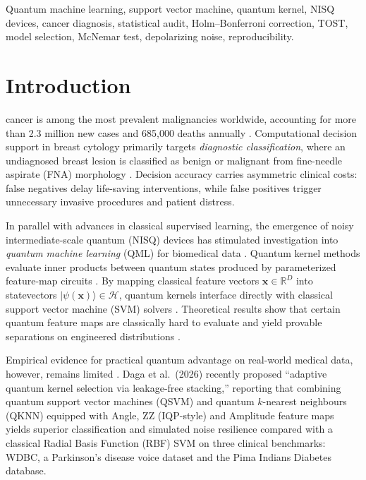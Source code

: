 \documentclass[journal,twocolumn]{IEEEtran}
\begin{document}
\begin{IEEEkeywords}
Quantum machine learning, support vector machine, quantum kernel, NISQ devices, cancer diagnosis, statistical audit, Holm--Bonferroni correction, TOST, model selection, McNemar test, depolarizing noise, reproducibility.
\end{IEEEkeywords}

\section{Introduction}

 cancer is among the most prevalent malignancies worldwide, accounting for more than 2.3 million new cases and 685,000 deaths annually \cite{globocan2020}. Computational decision support in breast cytology primarily targets \textit{diagnostic classification}, where an undiagnosed breast lesion is classified as benign or malignant from fine-needle aspirate (FNA) morphology \cite{mangasarian1995breast,street1993nuclear}. Decision accuracy carries asymmetric clinical costs: false negatives delay life-saving interventions, while false positives trigger unnecessary invasive procedures and patient distress.

In parallel with advances in classical supervised learning, the emergence of noisy intermediate-scale quantum (NISQ) devices \cite{preskill2018quantum} has stimulated investigation into \textit{quantum machine learning} (QML) for biomedical data \cite{biamonte2017quantum}. Quantum kernel methods evaluate inner products between quantum states produced by parameterized feature-map circuits \cite{havlicek2019supervised,schuld2019quantum}. By mapping classical feature vectors $\mathbf{x} \in \mathbb{R}^D$ into statevectors $|\psi(\mathbf{x})\rangle \in \mathcal{H}$, quantum kernels interface directly with classical support vector machine (SVM) solvers \cite{rebentrost2014quantum}. Theoretical results show that certain quantum feature maps are classically hard to evaluate and yield provable separations on engineered distributions \cite{liu2021rigorous}.

Empirical evidence for practical quantum advantage on real-world medical data, however, remains limited \cite{cerezo2021variational}. Daga et al.\ (2026) \cite{daga2026adaptive} recently proposed ``adaptive quantum kernel selection via leakage-free stacking,'' reporting that combining quantum support vector machines (QSVM) and quantum $k$-nearest neighbours (QKNN) equipped with Angle, ZZ (IQP-style) and Amplitude feature maps yields superior classification and simulated noise resilience compared with a classical Radial Basis Function (RBF) SVM on three clinical benchmarks: WDBC, a Parkinson's disease voice dataset and the Pima Indians Diabetes database.
\end{document}
